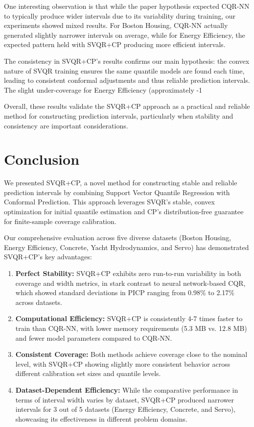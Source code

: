 \documentclass{article}
\begin{document}
One interesting observation is that while the paper hypothesis expected CQR-NN to typically produce wider intervals due to its variability during training, our experiments showed mixed results. For Boston Housing, CQR-NN actually generated slightly narrower intervals on average, while for Energy Efficiency, the expected pattern held with SVQR+CP producing more efficient intervals.

The consistency in SVQR+CP's results confirms our main hypothesis: the convex nature of SVQR training ensures the same quantile models are found each time, leading to consistent conformal adjustments and thus reliable prediction intervals. The slight under-coverage for Energy Efficiency (approximately -1%

Overall, these results validate the SVQR+CP approach as a practical and reliable method for constructing prediction intervals, particularly when stability and consistency are important considerations.

\section{Conclusion}
We presented SVQR+CP, a novel method for constructing stable and reliable prediction intervals by combining Support Vector Quantile Regression with Conformal Prediction. This approach leverages SVQR's stable, convex optimization for initial quantile estimation and CP's distribution-free guarantee for finite-sample coverage calibration.

Our comprehensive evaluation across five diverse datasets (Boston Housing, Energy Efficiency, Concrete, Yacht Hydrodynamics, and Servo) has demonstrated SVQR+CP's key advantages:

\begin{enumerate}
    \item \textbf{Perfect Stability:} SVQR+CP exhibits zero run-to-run variability in both coverage and width metrics, in stark contrast to neural network-based CQR, which showed standard deviations in PICP ranging from 0.98\% to 2.17\% across datasets.
    
    \item \textbf{Computational Efficiency:} SVQR+CP is consistently 4-7 times faster to train than CQR-NN, with lower memory requirements (5.3 MB vs. 12.8 MB) and fewer model parameters compared to CQR-NN.
    
    \item \textbf{Consistent Coverage:} Both methods achieve coverage close to the nominal level, with SVQR+CP showing slightly more consistent behavior across different calibration set sizes and quantile levels.
    
    \item \textbf{Dataset-Dependent Efficiency:} While the comparative performance in terms of interval width varies by dataset, SVQR+CP produced narrower intervals for 3 out of 5 datasets (Energy Efficiency, Concrete, and Servo), showcasing its effectiveness in different problem domains.
\end{enumerate}
\end{document}
